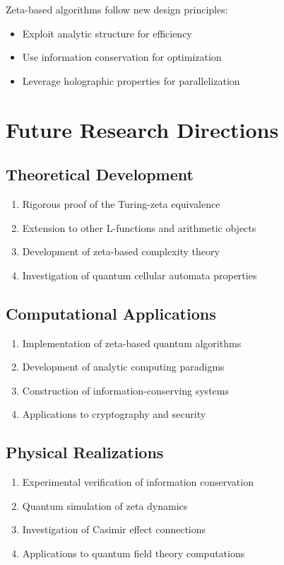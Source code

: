 \documentclass[12pt]{article}
\theoremstyle{plain}
\theoremstyle{definition}
\begin{document}
Zeta-based algorithms follow new design principles:
\begin{itemize}
\item Exploit analytic structure for efficiency
\item Use information conservation for optimization
\item Leverage holographic properties for parallelization
\end{itemize}

\section{Future Research Directions}

\subsection{Theoretical Development}

\begin{enumerate}
\item Rigorous proof of the Turing-zeta equivalence
\item Extension to other L-functions and arithmetic objects
\item Development of zeta-based complexity theory
\item Investigation of quantum cellular automata properties
\end{enumerate}

\subsection{Computational Applications}

\begin{enumerate}
\item Implementation of zeta-based quantum algorithms
\item Development of analytic computing paradigms
\item Construction of information-conserving systems
\item Applications to cryptography and security
\end{enumerate}

\subsection{Physical Realizations}

\begin{enumerate}
\item Experimental verification of information conservation
\item Quantum simulation of zeta dynamics
\item Investigation of Casimir effect connections
\item Applications to quantum field theory computations
\end{enumerate}
\end{document}
